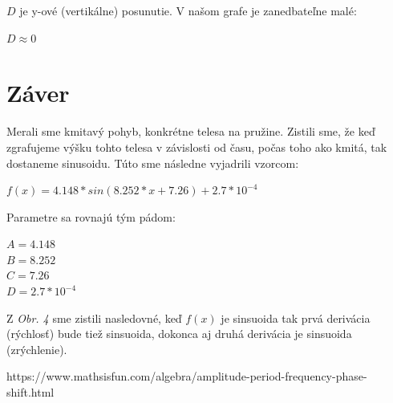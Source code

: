 \documentclass[11pt]{extarticle}
\begin{document}
$D$ je y-ové (vertikálne) posunutie.
V našom grafe je zanedbateľne malé:
\begin{center}
$D \approx 0$
\end{center}

\section{Záver}
Merali sme kmitavý pohyb, konkrétne telesa na pružine. Zistili sme, že keď zgrafujeme výšku tohto telesa v závislosti od času,
počas toho ako kmitá, tak dostaneme sinusoidu. Túto sme následne vyjadrili vzorcom:
\begin{center}$f(x) = 4.148*sin(8.252*x + 7.26) + 2.7*10^{-4}$\end{center}
Parametre sa rovnajú tým pádom:
\begin{center}
$A = 4.148$\\
$B = 8.252$\\
$C = 7.26$\\
$D = 2.7*10^{-4}$\\
\end{center}
Z \textit{Obr. 4} sme zistili nasledovné, keď $f(x)$ je sinsuoida tak prvá derivácia (rýchlosť) bude tiež sinsuoida, dokonca aj druhá derivácia je sinsuoida (zrýchlenie).
\begin{thebibliography}{3}
	https://www.mathsisfun.com/algebra/amplitude-period-frequency-phase-shift.html
\end{thebibliography}
\end{document}
